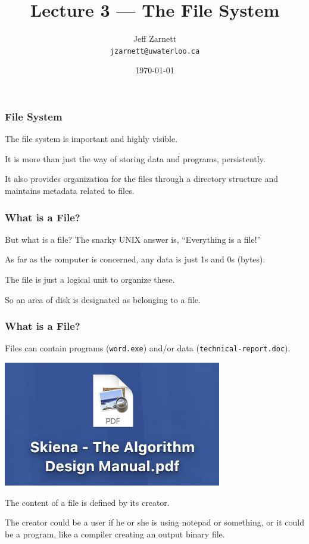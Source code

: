 

\title{Lecture 3 --- The File System }

\author{Jeff Zarnett \\ \small \texttt{jzarnett@uwaterloo.ca}}
\date{\today}




\begin{frame}
	\titlepage

\end{frame}



\begin{frame}
	\frametitle{File System}

	The file system is important and highly visible.

	It is more than just the way of storing data and programs, persistently.

	It also provides organization for the files through a directory structure and maintains metadata related to files.

\end{frame}

\begin{frame}
	\frametitle{What is a File?}

	But what is a file? The snarky UNIX answer is, ``Everything is a file!''

	As far as the computer is concerned, any data is just 1s and 0s (bytes).

	The file is just a logical unit to organize these.

	So an area of disk is designated as belonging to a file.

\end{frame}

\begin{frame}
	\frametitle{What is a File?}

	Files can contain programs (\texttt{word.exe}) and/or data (\texttt{technical-report.doc}).

	\begin{center}
		\includegraphics{images/file.png}
	\end{center}

	The content of a file is defined by its creator.

	The creator could be a user if he or she is using notepad or something, or it could be a program, like a compiler creating an output binary file.

\end{frame}

